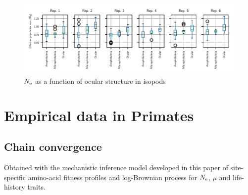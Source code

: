 \documentclass{article}
\begin{document}
	\begin{figure}[H]
		\centering
		\includegraphics[width=\linewidth, page=1]{isopods/12CDS_SiteMutSelBranchNe_Rep_LogPopulationSize_eye}
		\caption[$\Ne$ as a function of ocular structure in isopods]{$\Ne$ as a function of ocular structure in isopods}
	\end{figure}
	

	\section{Empirical data in Primates}
	\label{sec:empirical-data-in-primates}

	\subsection{Chain convergence}
	Obtained with the mechanistic inference model developed in this paper of site-specific amino-acid fitness profiles and log-Brownian process for $\Ne$, $\mu$ and life-history traits.
\end{document}
